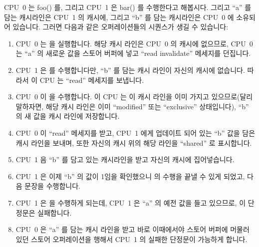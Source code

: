CPU~0 는 foo() 를, 그리고 CPU~1 은 bar() 를 수행한다고 해봅시다.
그리고 ``a'' 를 담는 캐시라인은 CPU~1 의 캐시에, 그리고 ``b'' 를 담는
캐시라인은 CPU~0 에 소유되어 있습니다.
그러면 다음과 같은 오퍼레이션들의 시퀀스가 생길 수 있습니다:
\begin{enumerate}
\item	CPU~0 는  을 실행합니다.
	해당 캐시 라인은 CPU~0 의 캐시에 없으므로, CPU~0 는 ``a'' 의 새로운
	값을 스토어 버퍼에 넣고 ``read invalidate'' 메세지를 던집니다.
\item	CPU~1 은  를 수행합니다만, ``b'' 를 담는
	캐시 라인이 자신의 캐시에 없습니다.
	따라서 이 CPU 는 ``read'' 메세지를 보냅니다.
\item	CPU~0 이  을 수행합니다.
	이 CPU 는 이 캐시 라인을 이미 가지고 있으므로(달리 말하자면, 해당 캐시
	라인은 이미 ``modified'' 또는 ``exclusive'' 상태입니다), ``b'' 의 새
	값을 캐시 라인에 저장합니다.
\item	CPU~0 이 ``read'' 메세지를 받고, CPU~1 에게 업데이트 되어 있는 ``b''
	값을 담은 캐시 라인을 보내며, 또한 자신의 캐시 위의 해당 라인을
	``shared'' 로 표시합니다.
\item	CPU~1 음 ``b'' 를 담고 있는 캐시라인을 받고 자신의 캐시에 집어넣습니다.
\item	CPU~1 은 이제 ``b'' 의 값이 1임을 확인했으니  의 수행을 끝낼 수 있게 되었고, 다음 문장을 수행합니다.
\item	CPU~1 은  을 수행하게 되는데, CPU~1 은 ``a'' 의 예전
	값을 들고 있으므로, 이 단정문은 실패합니다.
\item	CPU~0 은 ``a'' 를 담는 캐시 라인을 받고 바로 이때에서야 스토어 버퍼에
	머물러 있던 스토어 오퍼레이션을 행해서 CPU~1 의 실패한 단정문이
	가능하게 합니다.
\end{enumerate}
\iffalse


